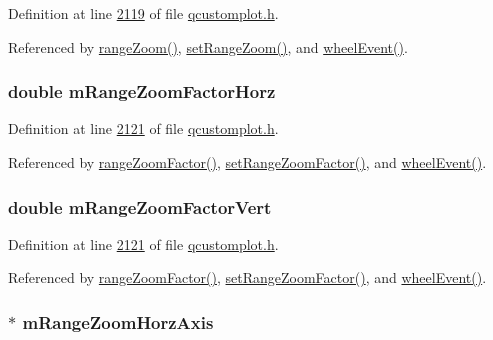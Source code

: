 Definition at line \hyperlink{a00116_source_l02119}{2119} of file \hyperlink{a00116_source}{qcustomplot.\+h}.



Referenced by \hyperlink{a00116_source_l01965}{range\+Zoom()}, \hyperlink{a00115_source_l06038}{set\+Range\+Zoom()}, and \hyperlink{a00115_source_l07811}{wheel\+Event()}.

\hypertarget{a00116_a575195f0c4e9f7a766495da2ac41e0a6}{
\subsubsection[{m\+Range\+Zoom\+Factor\+Horz}]{\setlength{\rightskip}{0pt plus 5cm}double m\+Range\+Zoom\+Factor\+Horz}}\label{a00116_a575195f0c4e9f7a766495da2ac41e0a6}


Definition at line \hyperlink{a00116_source_l02121}{2121} of file \hyperlink{a00116_source}{qcustomplot.\+h}.



Referenced by \hyperlink{a00115_source_l05871}{range\+Zoom\+Factor()}, \hyperlink{a00115_source_l06082}{set\+Range\+Zoom\+Factor()}, and \hyperlink{a00115_source_l07811}{wheel\+Event()}.

\hypertarget{a00116_a133700b56f6b8e472f99058b43f5a0e9}{
\subsubsection[{m\+Range\+Zoom\+Factor\+Vert}]{\setlength{\rightskip}{0pt plus 5cm}double m\+Range\+Zoom\+Factor\+Vert}}\label{a00116_a133700b56f6b8e472f99058b43f5a0e9}


Definition at line \hyperlink{a00116_source_l02121}{2121} of file \hyperlink{a00116_source}{qcustomplot.\+h}.



Referenced by \hyperlink{a00115_source_l05871}{range\+Zoom\+Factor()}, \hyperlink{a00115_source_l06082}{set\+Range\+Zoom\+Factor()}, and \hyperlink{a00115_source_l07811}{wheel\+Event()}.

\hypertarget{a00116_a3239b66fb24563a5dda0503a69a892d5}{
\subsubsection[{m\+Range\+Zoom\+Horz\+Axis}]{ $\ast$ m\+Range\+Zoom\+Horz\+Axis}}\label{a00116_a3239b66fb24563a5dda0503a69a892d5}


